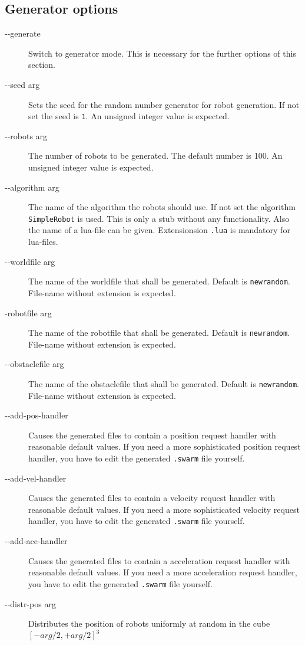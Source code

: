 \documentclass[a4paper,halfparskip,11pt,twoside]{scrartcl}
\begin{document}
\subsection{Generator options}
\begin{description}
	\item [-{}-generate] Switch to generator mode. This is necessary for the further options of this section.
	\item [-{}-seed arg] Sets the seed for the random number generator for robot generation. If not set the seed is {\tt 1}. An unsigned integer value is expected.
	\item [-{}-robots arg] The number of robots to be generated. The default number is 100. An unsigned integer value is expected.
	\item [-{}-algorithm arg] The name of the algorithm the robots should use. If not set the algorithm {\tt SimpleRobot} is used. This is only a stub without any functionality. Also the name of a lua-file can be given. Extensionsion {\tt .lua} is mandatory for lua-files.
	\item [-{}-worldfile arg] The name of the worldfile that shall be generated. Default is {\tt newrandom}. File-name without extension is expected.
	\item [-{}robotfile arg] The name of the robotfile that shall be generated. Default is {\tt newrandom}. File-name without extension is expected.
	\item [-{}-obstaclefile arg] The name of the obstaclefile that shall be generated. Default is {\tt newrandom}. File-name without extension is expected.
	\item [-{}-add-pos-handler] Causes the generated files to contain a position request handler with reasonable default values. If you need a more sophisticated position request handler, you have to edit the generated {\tt .swarm} file yourself.
	\item [-{}-add-vel-handler] Causes the generated files to contain a velocity request handler with reasonable default values. If you need a more sophisticated velocity request handler, you have to edit the generated {\tt .swarm} file yourself.
	\item [-{}-add-acc-handler] Causes the generated files to contain a acceleration request handler with reasonable default values. If you need a more acceleration request handler, you have to edit the generated {\tt .swarm} file yourself.
	\item [-{}-distr-pos arg] Distributes the position of robots uniformly at random in the cube $[-arg/2,+arg/2]^3$

\end{description}
\end{document}
